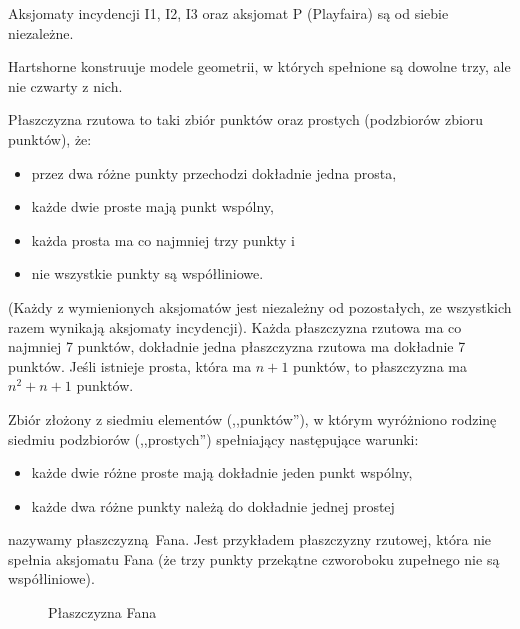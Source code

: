 \begin{proposition}
    Aksjomaty incydencji I1, I2, I3 oraz aksjomat P (Playfaira) są od siebie niezależne.
\end{proposition}

Hartshorne \cite[s. 69-70]{hartshorne2000} konstruuje modele geometrii, w których spełnione są dowolne trzy, ale nie czwarty z nich.

\begin{proposition}
    Płaszczyzna rzutowa to taki zbiór punktów oraz prostych (podzbiorów zbioru punktów), że:
    \begin{itemize}
        \item przez dwa różne punkty przechodzi dokładnie jedna prosta,
        \item każde dwie proste mają punkt wspólny,
        \item każda prosta ma co najmniej trzy punkty i
        \item nie wszystkie punkty są współliniowe.
    \end{itemize}
    (Każdy z wymienionych aksjomatów jest niezależny od pozostałych, ze wszystkich razem wynikają aksjomaty incydencji).
    Każda płaszczyzna rzutowa ma co najmniej 7 punktów, dokładnie jedna płaszczyzna rzutowa ma dokładnie 7 punktów.
    Jeśli istnieje prosta, która ma $n+1$ punktów, to płaszczyzna ma $n^2 + n + 1$ punktów.
\end{proposition} %

\begin{example}
    Zbiór złożony z siedmiu elementów (,,punktów''), w którym wyróżniono rodzinę siedmiu podzbiorów (,,prostych'') spełniający następujące warunki:
    \begin{itemize}
        \item każde dwie różne proste mają dokładnie jeden punkt wspólny,
        \item każde dwa różne punkty należą do dokładnie jednej prostej
    \end{itemize}
    nazywamy płaszczyzną Fana.
    Jest przykładem płaszczyzny rzutowej, która nie spełnia aksjomatu Fana (że trzy punkty przekątne czworoboku zupełnego nie są współliniowe).
    \begin{figure}[H]
        \centering
    \caption{Płaszczyzna Fana}
\end{figure}
\end{example}

